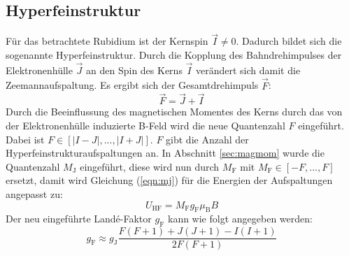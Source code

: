 \subsection{Hyperfeinstruktur}
Für das betrachtete Rubidium ist der Kernspin $\vec{I}\neq 0$. Dadurch bildet sich die sogenannte Hyperfeinstruktur.
Durch die Kopplung des Bahndrehimpulses der Elektronenhülle $\vec{J}$ an den Spin des Kerns $\vec{I}$ verändert sich damit die Zeemannaufspaltung. Es ergibt sich der Gesamtdrehimpuls $\vec{F}$:
\begin{equation}
  \label{eqn:gesamtdre}
  \vec{F}=\vec{J}+\vec{I}
\end{equation}
Durch die Beeinflussung des magnetischen Momentes des Kerns durch das von der Elektronenhülle induzierte B-Feld wird die neue Quantenzahl $F$ eingeführt. Dabei ist $F \in [|I-J|,...,|I+J|]$. $F$ gibt die Anzahl der Hyperfeinstrukturaufspaltungen an. In Abschnitt \ref{sec:magmom} wurde die Quantenzahl $M_\mathrm{J}$ eingeführt, diese wird nun durch $M_\mathrm{F}$ mit $M_\mathrm{F} \in [-F,...,F]$ ersetzt, damit wird Gleichung (\ref{eqn:mj}) für
die Energien der Aufspaltungen angepasst zu:
\begin{equation}
  \label{eqn:mf}
  U_\mathrm{HF}=M_\mathrm{F}g_\mathrm{F}\mu_\mathrm{B}B
\end{equation}
Der neu eingeführte Landé-Faktor $g_\mathrm{F}$ kann wie folgt angegeben werden:
\begin{equation}
  \label{eqn:gf}
  g_\mathrm{F}\approx g_\mathrm{J}\dfrac{F(F+1)+J(J+1)-I(I+1)}{2F(F+1)}
\end{equation}
